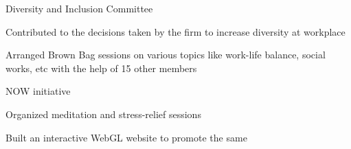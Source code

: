 
\begin{cventries}
  \cventry
    {} %
    {Diversity and Inclusion Committee} %
    {} %
    {} %
    {
      \begin{cvitems} %
        \item {Contributed to the decisions taken by the firm to increase diversity at workplace}
        \item {Arranged Brown Bag sessions on various topics like work-life balance, social works, etc with the help of 15 other members}
      \end{cvitems}
    }
    \cventry
    {} %
    {NOW initiative} %
    {} %
    {} %
    {
      \begin{cvitems} %
        \item {Organized meditation and stress-relief sessions}
        \item {Built an interactive WebGL website to promote the same}
      \end{cvitems}
    }

\end{cventries}